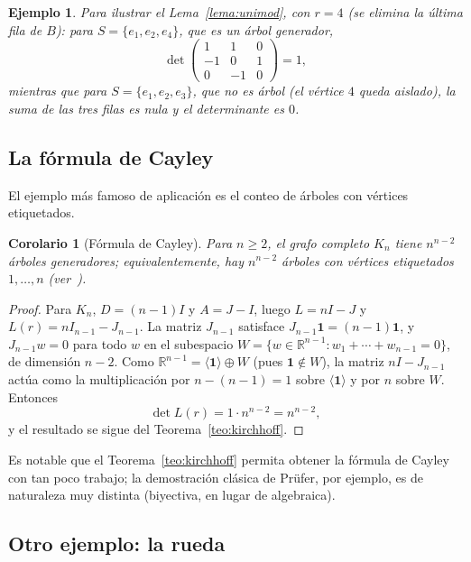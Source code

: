 \documentclass[12pt,a4paper]{article}
\theoremstyle{profesional}
\newtheorem{corolario}[teorema]{Corolario}
\theoremstyle{definicion-style}
\newtheorem{ejemplo}[teorema]{Ejemplo}
\theoremstyle{observacion-style}
\newcommand{\R}{\mathbb{R}}
\begin{document}
\begin{ejemplo}
    Para ilustrar el Lema~\ref{lema:unimod}, con \( r = 4 \) (se elimina la última fila de \( B \)): para \( S = \{e_1, e_2, e_4\} \), que es un árbol generador,
    \[
        \det \begin{pmatrix}
            1  & 1  & 0 \\
            -1 & 0  & 1 \\
            0  & -1 & 0
        \end{pmatrix} = 1,
    \]
    mientras que para \( S = \{e_1, e_2, e_3\} \), que no es árbol (el vértice \( 4 \) queda aislado), la suma de las tres filas es nula y el determinante es \( 0 \).
\end{ejemplo}

\subsection{La fórmula de Cayley}

El ejemplo más famoso de aplicación es el conteo de árboles con vértices etiquetados.

\begin{corolario}[Fórmula de Cayley]\label{cor:cayley}
    Para \( n \geq 2 \), el grafo completo \( K_n \) tiene \( n^{n-2} \) árboles generadores; equivalentemente, hay \( n^{n-2} \) árboles con vértices etiquetados \( 1, \ldots, n \) (ver~\cite{cayley}).
\end{corolario}
\begin{proof}
    Para \( K_n \), \( D = (n-1) I \) y \( A = J - I \), luego \( L = nI - J \) y \( L(r) = n I_{n-1} - J_{n-1} \).
    La matriz \( J_{n-1} \) satisface \( J_{n-1}\mathbf{1} = (n-1)\mathbf{1} \), y \( J_{n-1} w = 0 \) para todo \( w \) en el subespacio \( W = \{ w \in \R^{n-1} : w_1 + \cdots + w_{n-1} = 0 \} \), de dimensión \( n - 2 \).
    Como \( \R^{n-1} = \langle \mathbf{1} \rangle \oplus W \) (pues \( \mathbf{1} \notin W \)), la matriz \( n I - J_{n-1} \) actúa como la multiplicación por \( n - (n-1) = 1 \) sobre \( \langle \mathbf{1} \rangle \) y por \( n \) sobre \( W \). Entonces
    \[
        \det L(r) = 1 \cdot n^{n-2} = n^{n-2},
    \]
    y el resultado se sigue del Teorema~\ref{teo:kirchhoff}.
\end{proof}

Es notable que el Teorema~\ref{teo:kirchhoff} permita obtener la fórmula de Cayley con tan poco trabajo; la demostración clásica de Prüfer, por ejemplo, es de naturaleza muy distinta (biyectiva, en lugar de algebraica).

\subsection{Otro ejemplo: la rueda}
\end{document}
